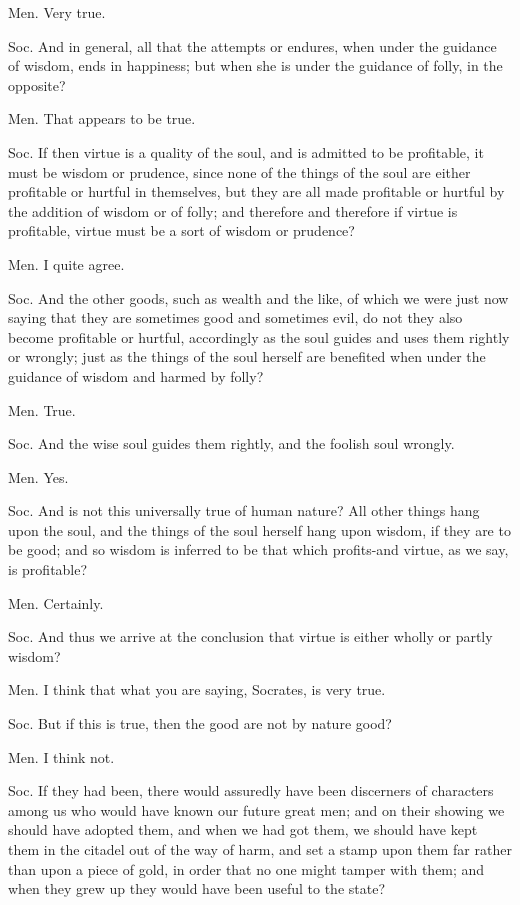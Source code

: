 Men. Very true. 

Soc. And in general, all that the attempts or endures, when under
the guidance of wisdom, ends in happiness; but when she is under the
guidance of folly, in the opposite? 

Men. That appears to be true. 

Soc. If then virtue is a quality of the soul, and is admitted to be
profitable, it must be wisdom or prudence, since none of the things
of the soul are either profitable or hurtful in themselves, but they
are all made profitable or hurtful by the addition of wisdom or of
folly; and therefore and therefore if virtue is profitable, virtue
must be a sort of wisdom or prudence? 

Men. I quite agree. 

Soc. And the other goods, such as wealth and the like, of which we
were just now saying that they are sometimes good and sometimes evil,
do not they also become profitable or hurtful, accordingly as the
soul guides and uses them rightly or wrongly; just as the things of
the soul herself are benefited when under the guidance of wisdom and
harmed by folly? 

Men. True. 

Soc. And the wise soul guides them rightly, and the foolish soul wrongly.

Men. Yes. 

Soc. And is not this universally true of human nature? All other things
hang upon the soul, and the things of the soul herself hang upon wisdom,
if they are to be good; and so wisdom is inferred to be that which
profits-and virtue, as we say, is profitable? 

Men. Certainly. 

Soc. And thus we arrive at the conclusion that virtue is either wholly
or partly wisdom? 

Men. I think that what you are saying, Socrates, is very true.

Soc. But if this is true, then the good are not by nature good?

Men. I think not. 

Soc. If they had been, there would assuredly have been discerners
of characters among us who would have known our future great men;
and on their showing we should have adopted them, and when we had
got them, we should have kept them in the citadel out of the way of
harm, and set a stamp upon them far rather than upon a piece of gold,
in order that no one might tamper with them; and when they grew up
they would have been useful to the state? 

